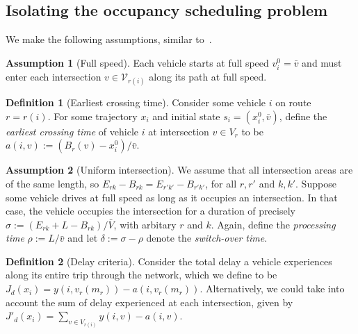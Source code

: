 \documentclass[a4paper]{report}
\theoremstyle{definition}
\newtheorem{define}{Definition}[chapter]
\newtheorem{assump}{Assumption}[chapter]
\theoremstyle{plain}
\begin{document}
\subsection{Isolating the occupancy scheduling problem}

We make the following assumptions, similar to~.

\begin{assump}[Full speed]
  Each vehicle starts at full speed $v_i^0 = \bar{v}$ and must enter each
  intersection $v \in \mathcal{V}_{r(i)}$ along its path at full speed.
\end{assump}

\begin{define}[Earliest crossing time]
  Consider some vehicle $i$ on route $r = r(i)$. For some trajectory $x_i$ and
  initial state $s_i = (x_i^0, \bar{v})$, define the \emph{earliest crossing
    time} of vehicle $i$ at intersection $v \in V_{r}$ to be
  $a(i, v) := (B_{r}(v) - x_i^0) / \bar{v}$.
\end{define}

\begin{assump}[Uniform intersection]
  We assume that all intersection areas are of the same length, so
  $E_{rk} - B_{rk} = E_{r'k'} - B_{r'k'}$, for all $r, r'$ and $k,k'$. Suppose
  some vehicle drives at full speed as long as it occupies an intersection. In
  that case, the vehicle occupies the intersection for a duration of precisely
  $\sigma := (E_{rk} + L - B_{rk}) / \bar{V}$, with arbitary $r$ and $k$. Again,
  define the \emph{processing time} $\rho := L / \bar{v}$ and let
  $\delta := \sigma - \rho$ denote the \emph{switch-over time}.
\end{assump}

\begin{define}[Delay criteria]
  Consider the total delay a vehicle experiences along its entire trip through
  the network, which we define to be
  $J_d(x_i) = y(i, v_r(m_r)) - a(i, v_r(m_r))$. Alternatively, we could take
  into account the sum of delay experienced at each intersection, given by
  $J'_{d}(x_i) = \sum_{v \in V_{r(i)}} y(i, v) - a(i, v)$.
\end{define}
\end{document}
